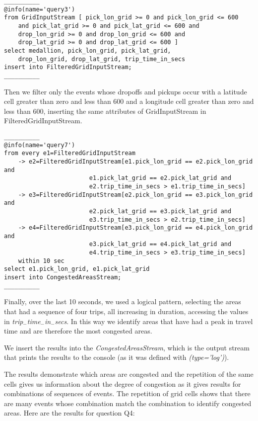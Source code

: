 \begin{lstlisting}
__________
@info(name='query3')
from GridInputStream [ pick_lon_grid >= 0 and pick_lon_grid <= 600 
	and pick_lat_grid >= 0 and pick_lat_grid <= 600 and 
	drop_lon_grid >= 0 and drop_lon_grid <= 600 and 
	drop_lat_grid >= 0 and drop_lat_grid <= 600 ]
select medallion, pick_lon_grid, pick_lat_grid, 
	drop_lon_grid, drop_lat_grid, trip_time_in_secs
insert into FilteredGridInputStream;
__________
\end{lstlisting}

Then we filter only the events whose dropoffs and pickups occur with a latitude cell greater than zero and less than 600 and a longitude cell greater than zero and less than 600, inserting the same attributes of GridInputStream in FilteredGridInputStream.\par

\begin{lstlisting}
__________
@info(name='query7')
from every e1=FilteredGridInputStream 
    -> e2=FilteredGridInputStream[e1.pick_lon_grid == e2.pick_lon_grid and 
    					e1.pick_lat_grid == e2.pick_lat_grid and 
    					e2.trip_time_in_secs > e1.trip_time_in_secs]
    -> e3=FilteredGridInputStream[e2.pick_lon_grid == e3.pick_lon_grid and 
    					e2.pick_lat_grid == e3.pick_lat_grid and 
    					e3.trip_time_in_secs > e2.trip_time_in_secs]
    -> e4=FilteredGridInputStream[e3.pick_lon_grid == e4.pick_lon_grid and 
    					e3.pick_lat_grid == e4.pick_lat_grid and 
    					e4.trip_time_in_secs > e3.trip_time_in_secs]
    within 10 sec
select e1.pick_lon_grid, e1.pick_lat_grid
insert into CongestedAreasStream;
__________
\end{lstlisting}

Finally, over the last 10 seconds, we used a logical pattern, selecting the areas that had a sequence of four trips, all increasing in duration, accessing the values in \textit{trip$_-$time$_-$in$_-$secs}. In this way we identify areas that have had a peak in travel time and are therefore the most congested areas.\par
We insert the results into the \textit{CongestedAreasStream}, which is the output stream that prints the results to the console (as it was defined with \textit{\@sink(type='log')}). \par
The results demonstrate which areas are congested and the repetition of the same cells gives us information about the degree of congestion as it gives results for combinations of sequences of events. The repetition of grid cells shows that there are many events whose combination match the combination to identify congested areas. Here are the results for question Q4:\par

